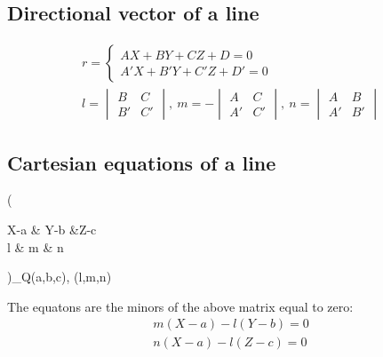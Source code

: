\documentclass{article}
\begin{document}
    \subsection*{Directional vector of a line}
        \begin{gather*}
            r =\begin{cases}
                AX + BY + CZ + D = 0 \\
                A'X + B'Y + C'Z + D' = 0
            \end{cases} \\
            l = \begin{vmatrix}
                B & C \\ B' & C'
            \end{vmatrix}, \
            m = - \begin{vmatrix}
                A & C \\ A' & C'
            \end{vmatrix}, \
            n = \begin{vmatrix}
                A & B \\ A' & B'
            \end{vmatrix}    
        \end{gather*}
    \subsection*{Cartesian equations of a line}
        \begin{flalign*}
            \left(\begin{matrix}
                X-a & Y-b &Z-c \\
                l & m & n
            \end{matrix}\right)_{Q\equiv (a,b,c), (l,m,n)}
        \end{flalign*}
        The equatons are the minors of the above matrix equal to zero:
        \begin{gather*}
            m\left( X - a \right) - l\left( Y - b\right) = 0 \\
            n\left( X - a \right) - l\left( Z - c\right) = 0  
        \end{gather*}
    
    \newpage
\end{document}
